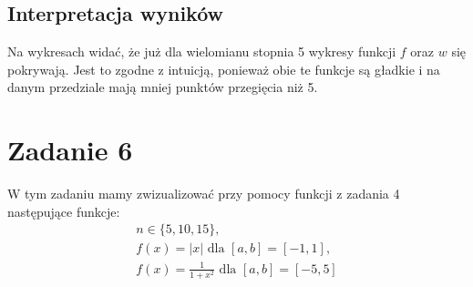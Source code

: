 \documentclass{article}
\begin{document}
\subsection*{Interpretacja wyników}
Na wykresach widać, że już dla wielomianu stopnia 5 wykresy funkcji $f$ oraz $w$
się pokrywają. Jest to zgodne z intuicją, ponieważ obie te funkcje są gładkie i
na danym przedziale mają mniej punktów przegięcia niż 5.



\section*{Zadanie 6}
W tym zadaniu mamy zwizualizować przy pomocy funkcji z zadania 4
następujące funkcje:
\begin{gather*}
    n \in \{5, 10, 15\},\\
    f(x) = |x| \text{ dla } [a, b] = [-1, 1],\\
    f(x) = \frac{1}{1+x^2} \text{ dla } [a, b] = [-5, 5]\\
\end{gather*}
\end{document}
